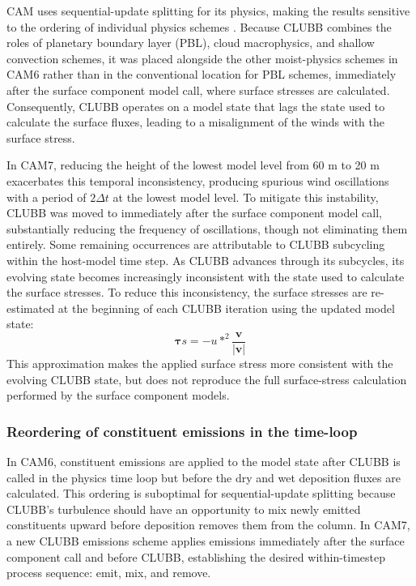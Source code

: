 \documentclass[draft]{agujournal2019}
\begin{document}
CAM uses sequential-update splitting for its physics, making the results sensitive to the ordering of individual physics schemes \cite{donahue2018}. Because CLUBB combines the roles of planetary boundary layer (PBL), cloud macrophysics, and shallow convection schemes, it was placed alongside the other moist-physics schemes in CAM6 rather than in the conventional location for PBL schemes, immediately after the surface component model call, where surface stresses are calculated. Consequently, CLUBB operates on a model state that lags the state used to calculate the surface fluxes, leading to a misalignment of the winds with the surface stress.

In CAM7, reducing the height of the lowest model level from 60 m to 20 m exacerbates this temporal inconsistency, producing spurious wind oscillations with a period of $2\Delta t$ at the lowest model level. To mitigate this instability, CLUBB was moved to immediately after the surface component model call, substantially reducing the frequency of oscillations, though not eliminating them entirely. Some remaining occurrences are attributable to CLUBB subcycling within the host-model time step. As CLUBB advances through its subcycles, its evolving state becomes increasingly inconsistent with the state used to calculate the surface stresses. To reduce this inconsistency, the surface stresses are re-estimated at the beginning of each CLUBB iteration using the updated model state:
\begin{equation}
\boldsymbol{\tau}{s} = -u{*}^{2}\frac{\mathbf{v}}{\lvert\mathbf{v}\rvert}
\end{equation}
This approximation makes the applied surface stress more consistent with the evolving CLUBB state, but does not reproduce the full surface-stress calculation performed by the surface component models.

\subsubsection{Reordering of constituent emissions in the time-loop}

In CAM6, constituent emissions are applied to the model state after CLUBB is called in the physics time loop but before the dry and wet deposition fluxes are calculated. This ordering is suboptimal for sequential-update splitting because CLUBB's turbulence should have an opportunity to mix newly emitted constituents upward before deposition removes them from the column. In CAM7, a new CLUBB emissions scheme applies emissions immediately after the surface component call and before CLUBB, establishing the desired within-timestep process sequence: emit, mix, and remove.
\end{document}
